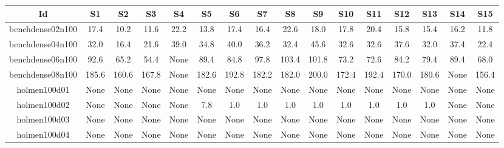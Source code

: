 \documentclass[landscape, 12pt]{report}
\begin{document}
\begin{tabular}{|c|c|c|c|c|c|c|c|c|c|c|c|c|c|c|c|}
\hline
\multicolumn{1}{|c|}{Id} & \multicolumn{1}{|c|}{S1} & \multicolumn{1}{|c|}{S2} & \multicolumn{1}{|c|}{S3} & \multicolumn{1}{|c|}{S4} & \multicolumn{1}{|c|}{S5} & \multicolumn{1}{|c|}{S6} & \multicolumn{1}{|c|}{S7} & \multicolumn{1}{|c|}{S8} & \multicolumn{1}{|c|}{S9} & \multicolumn{1}{|c|}{S10} & \multicolumn{1}{|c|}{S11} & \multicolumn{1}{|c|}{S12} & \multicolumn{1}{|c|}{S13} & \multicolumn{1}{|c|}{S14} & \multicolumn{1}{|c|}{S15}
\\
\hline
benchdense02n100 & 17.4 & 10.2 & 11.6 & 22.2 & 13.8 & 17.4 & 16.4 & 22.6 & 18.0 & 17.8 & 20.4 & 15.8 & 15.4 & 16.2 & 11.8
\\
benchdense04n100 & 32.0 & 16.4 & 21.6 & 39.0 & 34.8 & 40.0 & 36.2 & 32.4 & 45.6 & 32.6 & 32.6 & 37.6 & 32.0 & 37.4 & 22.4
\\
benchdense06n100 & 92.6 & 65.2 & 54.4 & None & 89.4 & 84.8 & 97.8 & 103.4 & 101.8 & 73.2 & 72.6 & 84.2 & 79.4 & 89.4 & 68.0
\\
benchdense08n100 & 185.6 & 160.6 & 167.8 & None & 182.6 & 192.8 & 182.2 & 182.0 & 200.0 & 172.4 & 192.4 & 170.0 & 180.6 & None & 156.4
\\
holmen100d01 & None & None & None & None & None & None & None & None & None & None & None & None & None & None & None
\\
holmen100d02 & None & None & None & None &  7.8 &  1.0 &  1.0 &  1.0 &  1.0 &  1.0 &  1.0 &  1.0 &  1.0 & None & None
\\
holmen100d03 & None & None & None & None & None & None & None & None & None & None & None & None & None & None & None
\\
holmen100d04 & None & None & None & None & None & None & None & None & None & None & None & None & None & None & None
\\
\hline 
 \end{tabular}
\end{document}
